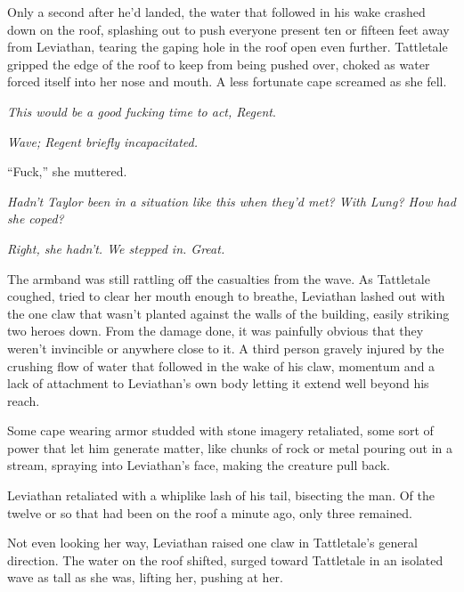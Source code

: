 {Only a second after he'd landed, the water that followed in his wake crashed down on the roof, splashing out to push everyone present ten or fifteen feet away from Leviathan, tearing the gaping hole in the roof open even further.  Tattletale gripped the edge of the roof to keep from being pushed over, choked as water forced itself into her nose and mouth.  A less fortunate cape screamed as she fell.



\emph{This would be a good fucking time to act, Regent}.



\emph{Wave; Regent briefly incapacitated.}



``Fuck,'' she muttered.



\emph{Hadn't Taylor been in a situation like this when they'd met?  With Lung?  How had she coped?}



\emph{Right, she hadn't.  We stepped in.  Great.}



The armband was still rattling off the casualties from the wave.  As Tattletale coughed, tried to clear her mouth enough to breathe, Leviathan lashed out with the one claw that wasn't planted against the walls of the building, easily striking two heroes down.  From the damage done, it was painfully obvious that they weren't invincible or anywhere close to it.  A third person gravely injured by the crushing flow of water that followed in the wake of his claw, momentum and a lack of attachment to Leviathan's own body letting it extend well beyond his reach.



Some cape wearing armor studded with stone imagery retaliated, some sort of power that let him generate matter, like chunks of rock or metal pouring out in a stream, spraying into Leviathan's face, making the creature pull back.



Leviathan retaliated with a whiplike lash of his tail, bisecting the man.  Of the twelve or so that had been on the roof a minute ago, only three remained.



Not even looking her way, Leviathan raised one claw in Tattletale's general direction.  The water on the roof shifted, surged toward Tattletale in an isolated wave as tall as she was, lifting her, pushing at her.



}
